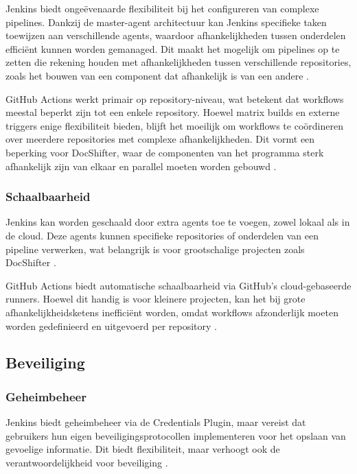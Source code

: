 Jenkins biedt ongeëvenaarde flexibiliteit bij het configureren van complexe pipelines. Dankzij de master-agent architectuur kan Jenkins specifieke taken toewijzen aan verschillende agents, waardoor afhankelijkheden tussen onderdelen efficiënt kunnen worden gemanaged. Dit maakt het mogelijk om pipelines op te zetten die rekening houden met afhankelijkheden tussen verschillende repositories, zoals het bouwen van een component dat afhankelijk is van een andere \autocite{kulkarni2022}.

GitHub Actions werkt primair op repository-niveau, wat betekent dat workflows meestal beperkt zijn tot een enkele repository. Hoewel matrix builds en externe triggers enige flexibiliteit bieden, blijft het moeilijk om workflows te coördineren over meerdere repositories met complexe afhankelijkheden. Dit vormt een beperking voor DocShifter, waar de componenten van het programma sterk afhankelijk zijn van elkaar en parallel moeten worden gebouwd \autocite{spacelift2023}.

\subsubsection{Schaalbaarheid}

Jenkins kan worden geschaald door extra agents toe te voegen, zowel lokaal als in de cloud. Deze agents kunnen specifieke repositories of onderdelen van een pipeline verwerken, wat belangrijk is voor grootschalige projecten zoals DocShifter \autocite{spacelift2023}.

GitHub Actions biedt automatische schaalbaarheid via GitHub's cloud-gebaseerde runners. Hoewel dit handig is voor kleinere projecten, kan het bij grote afhankelijkheidsketens inefficiënt worden, omdat workflows afzonderlijk moeten worden gedefinieerd en uitgevoerd per repository \autocite{kulkarni2022}.

\subsection{Beveiliging}

\subsubsection{Geheimbeheer}

Jenkins biedt geheimbeheer via de Credentials Plugin, maar vereist dat gebruikers hun eigen beveiligingsprotocollen implementeren voor het opslaan van gevoelige informatie. Dit biedt flexibiliteit, maar verhoogt ook de verantwoordelijkheid voor beveiliging \autocite{githubdocs2023actions}.

